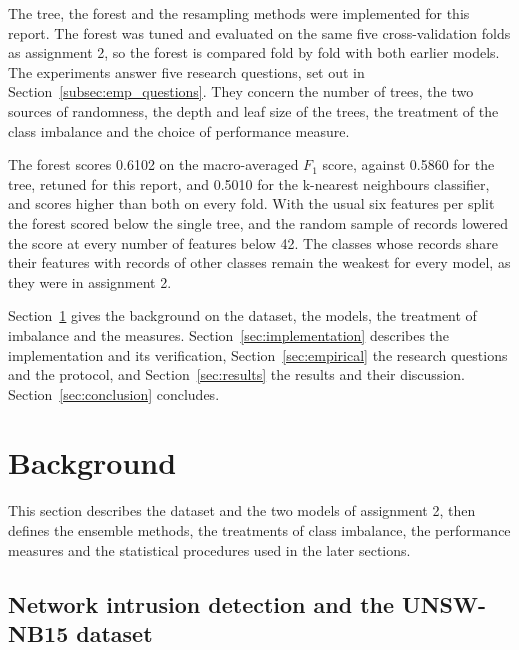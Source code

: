 \documentclass[conference,10pt]{IEEEtran}
\begin{document}
The tree, the forest and the resampling methods were implemented for this
report. The forest was tuned and evaluated on the same five cross-validation
folds as assignment 2, so the forest is compared fold by fold with both
earlier models. The experiments answer five research questions, set out in
Section~\ref{subsec:emp_questions}. They concern the number of trees, the
two sources of randomness, the depth and leaf size of the trees, the
treatment of the class imbalance and the choice of performance measure.

The forest scores 0.6102 on the macro-averaged $F_1$ score, against 0.5860
for the tree, retuned for this report, and 0.5010 for the k-nearest
neighbours classifier, and scores higher than both on every fold.  With the usual six
features per split the forest scored below the single tree, and the random
sample of records lowered the score at every number of features below 42.
The classes whose records share their features with records of other classes
remain the weakest for every model, as they were in assignment 2.

Section~\ref{sec:background} gives the background on the dataset, the
models, the treatment of imbalance and the measures.
Section~\ref{sec:implementation} describes the implementation and its
verification, Section~\ref{sec:empirical} the research questions and the
protocol, and Section~\ref{sec:results} the results and their discussion.
Section~\ref{sec:conclusion} concludes.

\section{Background}
\label{sec:background}

This section describes the dataset and the two models of assignment 2, then
defines the ensemble methods, the treatments of class imbalance, the
performance measures and the statistical procedures used in the later
sections.

\subsection{Network intrusion detection and the UNSW-NB15 dataset}
\label{subsec:bg_dataset}
\end{document}

